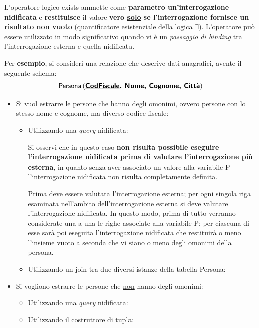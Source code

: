\documentclass[a4paper]{article}
\begin{document}
	\noindent
	L'operatore logico \textcolor{Red3}{\textsf{exists}} ammette come \textbf{parametro un'interrogazione nidificata} e \textbf{restituisce} il valore \textbf{vero \underline{solo} se l'interrogazione fornisce un risultato non vuoto} (quantificatore esistenziale della logica $\exists$). L'operatore può essere utilizzato in modo significativo quando vi è un \emph{passaggio di binding} tra l'interrogazione esterna e quella nidificata.\newpage
	
	\noindent
	Per \textcolor{Green4}{\textbf{esempio}}, si consideri una relazione che descrive dati anagrafici, avente il seguente schema:
	\begin{equation*}
		\textsf{Persona}\left(\textbf{\textsf{\underline{CodFiscale}}, \textsf{Nome}, \textsf{Cognome}, \textsf{Città}}\right)
	\end{equation*}
	\begin{itemize}
		\item Si vuol estrarre le persone che hanno degli omonimi, ovvero persone con lo stesso nome e cognome, ma diverso codice fiscale:
		\begin{itemize}
			\item Utilizzando una \emph{query} nidificata:
			
			Si osservi che in questo caso \textbf{non risulta possibile eseguire l'interrogazione nidificata prima di valutare l'interrogazione più esterna}, in quanto senza aver associato un valore alla variabile \textsf{P} l'interrogazione nidificata non risulta completamente definita.
			
			Prima deve essere valutata l'interrogazione esterna; per ogni singola riga esaminata nell'ambito dell'interrogazione esterna si deve valutare l'interrogazione nidificata. In questo modo, prima di tutto verranno considerate una a una le righe associate alla variabile \textsf{P}; per ciascuna di esse sarà poi eseguita l'interrogazione nidificata che restituirà o meno l'insieme vuoto a seconda che vi siano o meno degli omonimi della persona.
			
			
			\item Utilizzando un join tra due diversi istanze della tabella \textsf{Persona}:
			
		\end{itemize}		
		
		\item Si vogliono estrarre le persone che \underline{non} hanno degli omonimi:
		\begin{itemize}
			\item Utilizzando una \emph{query} nidificata:
			
			
			\item Utilizzando il costruttore di tupla:
			
		\end{itemize}
	\end{itemize}\newpage
\end{document}
